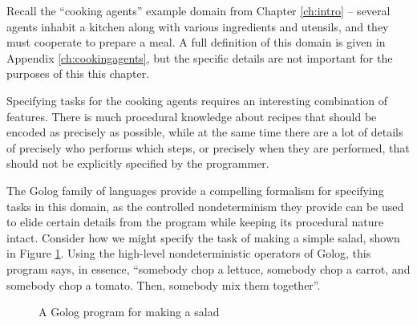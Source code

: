 Recall the {}``cooking agents'' example domain from Chapter \ref{ch:intro}
-- several agents inhabit a kitchen along with various ingredients
and utensils, and they must cooperate to prepare a meal. A full definition
of this domain is given in Appendix \ref{ch:cookingagents}, but the
specific details are not important for the purposes of this this chapter.

Specifying tasks for the cooking agents requires an interesting combination
of features. There is much procedural knowledge about recipes that
should be encoded as precisely as possible, while at the same time
there are a lot of details of precisely who performs which steps,
or precisely when they are performed, that should not be explicitly
specified by the programmer.

The Golog family of languages provide a compelling formalism for specifying
tasks in this domain, as the controlled nondeterminism they provide
can be used to elide certain details from the program while keeping
its procedural nature intact. Consider how we might specify the task
of making a simple salad, shown in Figure \ref{fig:MIndiGolog:MakeSalad}.
Using the high-level nondeterministic operators of Golog, this program
says, in essence, {}``somebody chop a lettuce, somebody chop a carrot,
and somebody chop a tomato. Then, somebody mix them together''.

%
\begin{figure}[!t]
 

\begin{centering}
\par\end{centering}

\caption{A Golog program for making a salad\label{fig:MIndiGolog:MakeSalad}}

\end{figure}


